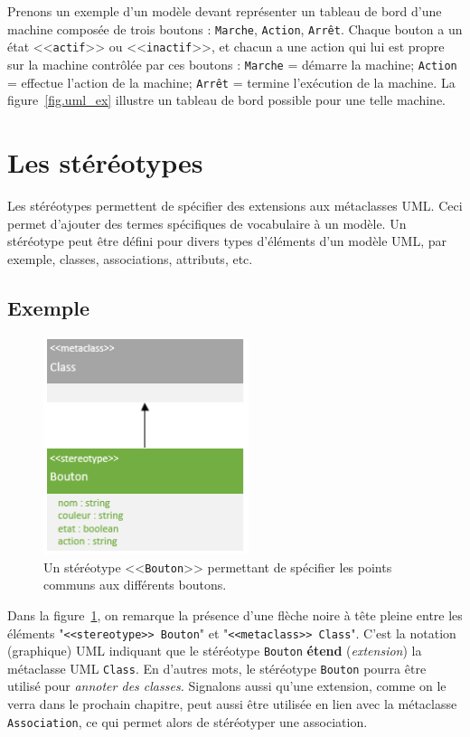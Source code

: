 Prenons un exemple d'un mod\`ele devant représenter un tableau de bord d'une machine composée de trois boutons : \texttt{Marche}, \texttt{Action}, \texttt{Arrêt}.
Chaque bouton a un état <<\texttt{actif}>> ou <<\texttt{inactif}>>, et
chacun a une action qui lui est propre sur la machine contr\^ol\'ee par ces boutons : \texttt{Marche} = démarre la machine; \texttt{Action} = effectue l'action de la machine; \texttt{Arrêt} = termine l'ex\'ecution de la machine.
%
La figure~\ref{fig.uml_ex} illustre un tableau de bord possible pour une telle machine.


\section{Les stéréotypes}
\label{sect.uml.ster}
Les stéréotypes permettent de spécifier des extensions aux métaclasses UML.
Ceci permet d'ajouter des termes spécifiques de vocabulaire à un mod\`ele.
Un stéréotype peut être défini pour divers types d'éléments d'un mod\`ele UML, par exemple, classes, associations, attributs, etc.


\subsection*{Exemple}
%
\begin{figure}
    \begin{center}
    \includegraphics[width=6cm]{10_img/chap4/button.PNG}
    \caption[Un st\'er\'eotype <<\texttt{Bouton}>>.]{Un st\'er\'eotype <<\texttt{Bouton}>> permettant de sp\'ecifier les points communs aux diff\'erents boutons.}
    \label{fig.uml_but_definition}
    \end{center}
\end{figure}

Dans la figure~\ref{fig.uml_but_definition}, on remarque la présence d'une flèche noire à tête pleine entre les éléments "\texttt{<<stereotype>> Bouton}" et "\texttt{<<metaclass>>~Class}".
C'est la notation (graphique) UML indiquant que le st\'er\'eotype \texttt{Bouton} \textbf{étend} (\emph{extension}) la métaclasse UML \texttt{Class}.
%
En d'autres mots, le stéréotype \texttt{Bouton} pourra être utilisé pour \emph{annoter des classes.}
%
Signalons aussi qu'une extension, comme on le verra dans le prochain chapitre, peut aussi être utilisée en lien avec la métaclasse \texttt{Association}, ce qui permet alors de stéréotyper une association.

